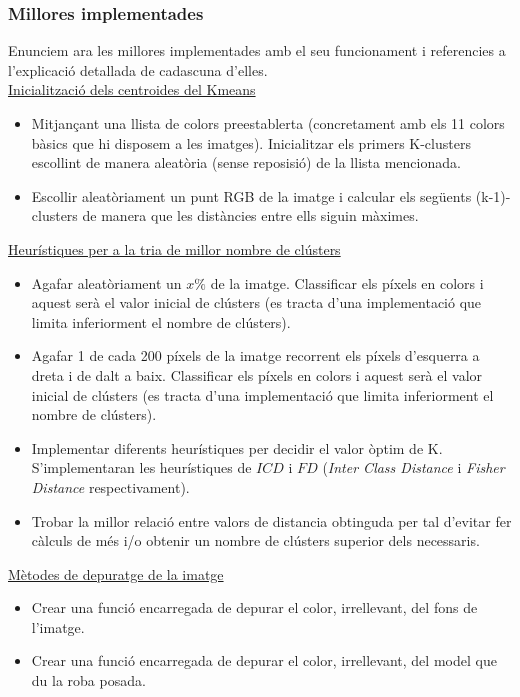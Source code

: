 \documentclass[a4paper, 11pt]{article}
\begin{document}
\subsubsection{Millores implementades}\label{millores_implementades}
Enunciem ara les millores implementades amb el seu funcionament i referencies a l'explicació detallada de cadascuna d'elles.\\
\underline{Inicialització dels centroides del Kmeans}
\begin{itemize}
    \item Mitjançant una llista de colors preestablerta (concretament amb els 11 colors bàsics que hi disposem a les imatges). Inicialitzar els primers K-clusters escollint de manera aleatòria (sense reposisió) de la llista mencionada. 
    \item Escollir aleatòriament un punt RGB de la imatge i calcular els següents (k-1)-clusters de manera que les distàncies entre ells siguin màximes.
\end{itemize}
\underline{Heurístiques per a la tria de millor nombre de clústers}
\begin{itemize}
    \item Agafar aleatòriament un $x\%$ de la imatge. Classificar els píxels en colors i aquest serà el valor inicial de clústers (es tracta d'una implementació que limita inferiorment el nombre de clústers). 
    \item Agafar 1 de cada 200 píxels de la imatge recorrent els píxels d'esquerra a dreta i de dalt a baix. Classificar els píxels en colors i aquest serà el valor inicial de clústers (es tracta d'una implementació que limita inferiorment el nombre de clústers).
    \item Implementar diferents heurístiques per decidir el valor òptim de K. S'implementaran les heurístiques de $ICD$ i $FD$ (\textit{Inter Class Distance} i \textit{Fisher Distance} respectivament). 
    \item Trobar la millor relació entre valors de distancia obtinguda per tal d'evitar fer càlculs de més i/o obtenir un nombre de clústers superior dels necessaris. 
\end{itemize}
\newpage
\hspace{-1.5em}\underline{Mètodes de depuratge de la imatge}\label{depuratge}
\begin{itemize}
    \item Crear una funció encarregada de depurar el color, irrellevant, del fons de l'imatge.
    \item Crear una funció encarregada de depurar el color, irrellevant, del model que du la roba posada.
\end{itemize}
\end{document}
